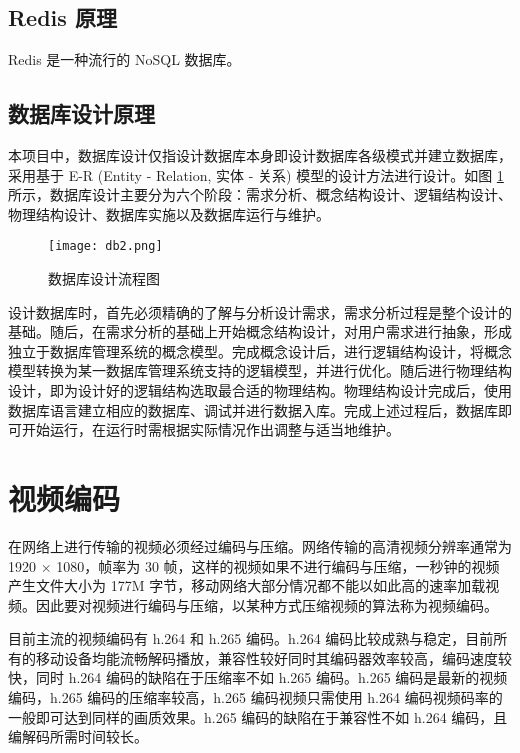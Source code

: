 \subsection{Redis 原理}

Redis 是一种流行的 NoSQL 数据库。

\subsection{数据库设计原理}

本项目中，数据库设计仅指设计数据库本身即设计数据库各级模式并建立数据库，采用基于 E-R (Entity - Relation, 实体 - 关系) 模型的设计方法进行设计。如图 \ref{fig:db2} 所示，数据库设计主要分为六个阶段：需求分析、概念结构设计、逻辑结构设计、物理结构设计、数据库实施以及数据库运行与维护。

\begin{figure}[!ht]
    \centering
    \texttt{[image: db2.png]}
    \caption{数据库设计流程图}
    \label{fig:db2}
\end{figure}

设计数据库时，首先必须精确的了解与分析设计需求，需求分析过程是整个设计的基础。随后，在需求分析的基础上开始概念结构设计，对用户需求进行抽象，形成独立于数据库管理系统的概念模型。完成概念设计后，进行逻辑结构设计，将概念模型转换为某一数据库管理系统支持的逻辑模型，并进行优化。随后进行物理结构设计，即为设计好的逻辑结构选取最合适的物理结构。物理结构设计完成后，使用数据库语言建立相应的数据库、调试并进行数据入库。完成上述过程后，数据库即可开始运行，在运行时需根据实际情况作出调整与适当地维护。


\section{视频编码}

在网络上进行传输的视频必须经过编码与压缩。网络传输的高清视频分辨率通常为 1920 $\times$ 1080，帧率为 30 帧，这样的视频如果不进行编码与压缩，一秒钟的视频产生文件大小为 177M 字节，移动网络大部分情况都不能以如此高的速率加载视频。因此要对视频进行编码与压缩，以某种方式压缩视频的算法称为视频编码。

目前主流的视频编码有 h.264 和 h.265 编码。h.264 编码比较成熟与稳定，目前所有的移动设备均能流畅解码播放，兼容性较好同时其编码器效率较高，编码速度较快，同时 h.264 编码的缺陷在于压缩率不如 h.265 编码。h.265 编码是最新的视频编码，h.265 编码的压缩率较高，h.265 编码视频只需使用 h.264 编码视频码率的一般即可达到同样的画质效果。h.265 编码的缺陷在于兼容性不如 h.264 编码，且编解码所需时间较长。


